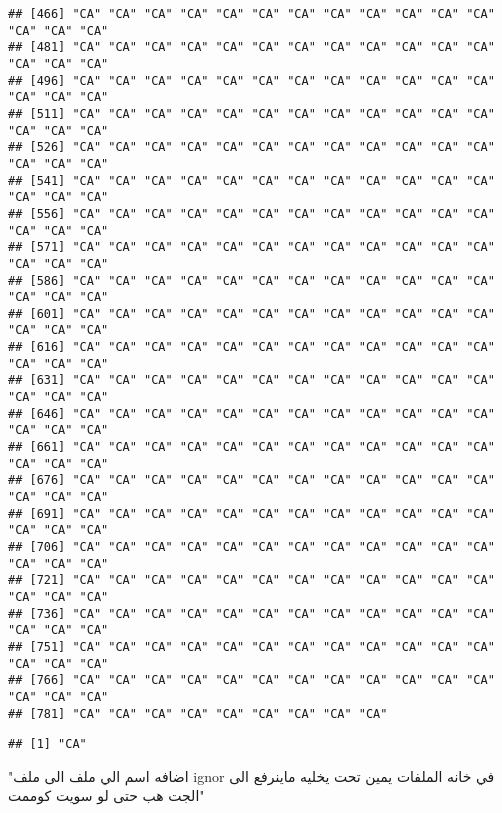 \documentclass[
]{article}
\newenvironment{Shaded}{\begin{snugshade}}{\end{snugshade}}
\newcommand{\FunctionTok}[1]{\textcolor[rgb]{0.00,0.00,0.00}{#1}}
\newcommand{\NormalTok}[1]{#1}
\newcommand{\SpecialCharTok}[1]{\textcolor[rgb]{0.00,0.00,0.00}{#1}}
\newcommand{\StringTok}[1]{\textcolor[rgb]{0.31,0.60,0.02}{#1}}
\begin{document}
\begin{verbatim}
## [466] "CA" "CA" "CA" "CA" "CA" "CA" "CA" "CA" "CA" "CA" "CA" "CA" "CA" "CA" "CA"
## [481] "CA" "CA" "CA" "CA" "CA" "CA" "CA" "CA" "CA" "CA" "CA" "CA" "CA" "CA" "CA"
## [496] "CA" "CA" "CA" "CA" "CA" "CA" "CA" "CA" "CA" "CA" "CA" "CA" "CA" "CA" "CA"
## [511] "CA" "CA" "CA" "CA" "CA" "CA" "CA" "CA" "CA" "CA" "CA" "CA" "CA" "CA" "CA"
## [526] "CA" "CA" "CA" "CA" "CA" "CA" "CA" "CA" "CA" "CA" "CA" "CA" "CA" "CA" "CA"
## [541] "CA" "CA" "CA" "CA" "CA" "CA" "CA" "CA" "CA" "CA" "CA" "CA" "CA" "CA" "CA"
## [556] "CA" "CA" "CA" "CA" "CA" "CA" "CA" "CA" "CA" "CA" "CA" "CA" "CA" "CA" "CA"
## [571] "CA" "CA" "CA" "CA" "CA" "CA" "CA" "CA" "CA" "CA" "CA" "CA" "CA" "CA" "CA"
## [586] "CA" "CA" "CA" "CA" "CA" "CA" "CA" "CA" "CA" "CA" "CA" "CA" "CA" "CA" "CA"
## [601] "CA" "CA" "CA" "CA" "CA" "CA" "CA" "CA" "CA" "CA" "CA" "CA" "CA" "CA" "CA"
## [616] "CA" "CA" "CA" "CA" "CA" "CA" "CA" "CA" "CA" "CA" "CA" "CA" "CA" "CA" "CA"
## [631] "CA" "CA" "CA" "CA" "CA" "CA" "CA" "CA" "CA" "CA" "CA" "CA" "CA" "CA" "CA"
## [646] "CA" "CA" "CA" "CA" "CA" "CA" "CA" "CA" "CA" "CA" "CA" "CA" "CA" "CA" "CA"
## [661] "CA" "CA" "CA" "CA" "CA" "CA" "CA" "CA" "CA" "CA" "CA" "CA" "CA" "CA" "CA"
## [676] "CA" "CA" "CA" "CA" "CA" "CA" "CA" "CA" "CA" "CA" "CA" "CA" "CA" "CA" "CA"
## [691] "CA" "CA" "CA" "CA" "CA" "CA" "CA" "CA" "CA" "CA" "CA" "CA" "CA" "CA" "CA"
## [706] "CA" "CA" "CA" "CA" "CA" "CA" "CA" "CA" "CA" "CA" "CA" "CA" "CA" "CA" "CA"
## [721] "CA" "CA" "CA" "CA" "CA" "CA" "CA" "CA" "CA" "CA" "CA" "CA" "CA" "CA" "CA"
## [736] "CA" "CA" "CA" "CA" "CA" "CA" "CA" "CA" "CA" "CA" "CA" "CA" "CA" "CA" "CA"
## [751] "CA" "CA" "CA" "CA" "CA" "CA" "CA" "CA" "CA" "CA" "CA" "CA" "CA" "CA" "CA"
## [766] "CA" "CA" "CA" "CA" "CA" "CA" "CA" "CA" "CA" "CA" "CA" "CA" "CA" "CA" "CA"
## [781] "CA" "CA" "CA" "CA" "CA" "CA" "CA" "CA" "CA"
\end{verbatim}

\begin{Shaded}
\end{Shaded}

\begin{verbatim}
## [1] "CA"
\end{verbatim}

\begin{Shaded}
\begin{Highlighting}[]
\StringTok{"اضافه اسم الي ملف الى ملف }
\StringTok{ignor}
\StringTok{في خانه الملفات يمين تحت يخليه ماينرفع الى الجت هب حتى لو سويت كوممت"}
\end{Highlighting}
\end{Shaded}
\end{document}
